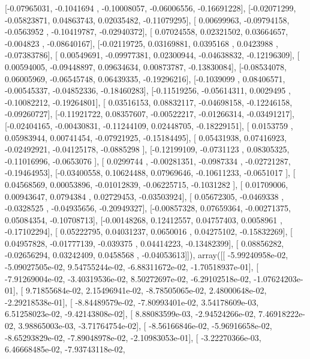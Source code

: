 \documentclass{article}
\begin{document}
       [-0.07965031, -0.1041694 , -0.10008057, -0.06006556, -0.16691228],
       [-0.02071299, -0.05823871,  0.04863743,  0.02035482, -0.11079295],
       [ 0.00699963, -0.09794158, -0.0563952 , -0.10419787, -0.02940372],
       [ 0.07024558,  0.02321502,  0.03664657, -0.004823  , -0.08640167],
       [-0.02119725,  0.03169881,  0.0395168 ,  0.0423988 , -0.07383786],
       [ 0.00549691, -0.09977381,  0.02300944, -0.04638832, -0.12196309],
       [ 0.00594005, -0.09448897,  0.09634634,  0.00873787, -0.13830084],
       [-0.08534078,  0.06005969, -0.06545748,  0.06439335, -0.19296216],
       [-0.1039099 ,  0.08406571, -0.00545337, -0.04852336, -0.18460283],
       [-0.11519256, -0.05614311,  0.0029495 , -0.10082212, -0.19264801],
       [ 0.03516153,  0.08832117, -0.04698158, -0.12246158, -0.09260727],
       [-0.11921722,  0.08357607, -0.00522217, -0.01266314, -0.03491217],
       [-0.02404165, -0.00430831, -0.11244109,  0.02448705, -0.18229151],
       [ 0.0153759 ,  0.05983944,  0.00741454, -0.07921925, -0.15184495],
       [ 0.05431938,  0.07416923, -0.02492921, -0.04125178, -0.0885298 ],
       [-0.12199109, -0.0731123 ,  0.08305325, -0.11016996, -0.0653076 ],
       [ 0.0299744 , -0.00281351, -0.0987334 , -0.02721287, -0.19464953],
       [-0.03400558,  0.10624488,  0.07969646, -0.10611233, -0.0651017 ],
       [ 0.04568569,  0.00053896, -0.01012839, -0.06225715, -0.1031282 ],
       [ 0.01709006,  0.00943647,  0.0794384 ,  0.02729453, -0.03503924],
       [ 0.05672305, -0.0469338 , -0.0328525 , -0.04935656, -0.20949327],
       [-0.00857328,  0.07659364, -0.00271375,  0.05084354, -0.10708713],
       [-0.00148268,  0.12412557,  0.04757403,  0.0058961 , -0.17102294],
       [ 0.05222795,  0.04031237,  0.0650016 ,  0.04275102, -0.15832269],
       [ 0.04957828, -0.01777139, -0.039375  ,  0.04414223, -0.13482399],
       [ 0.08856282, -0.02656294,  0.03242409,  0.0458568 , -0.04053613]]), array([[ -5.99240958e-02,  -5.09027505e-02,   9.54755244e-02,
         -6.88311672e-02,  -1.70518937e-01],
       [ -7.91269004e-02,  -3.40319536e-02,   8.50272697e-02,
         -6.29102518e-02,  -1.07624203e-01],
       [  9.71855684e-02,   2.15496941e-02,  -8.78505065e-02,
          2.48000648e-02,  -2.29218538e-01],
       [ -8.84489579e-02,  -7.80993401e-02,   3.54178609e-03,
          6.51258023e-02,  -9.42143808e-02],
       [  8.88083599e-03,  -2.94524266e-02,   7.46918222e-02,
          3.98865003e-03,  -3.71764754e-02],
       [ -8.56166846e-02,  -5.96916658e-02,  -8.65293829e-02,
         -7.89048978e-02,  -2.10983053e-01],
       [ -3.22270366e-03,   6.46668485e-02,  -7.93743118e-02,
\end{document}
